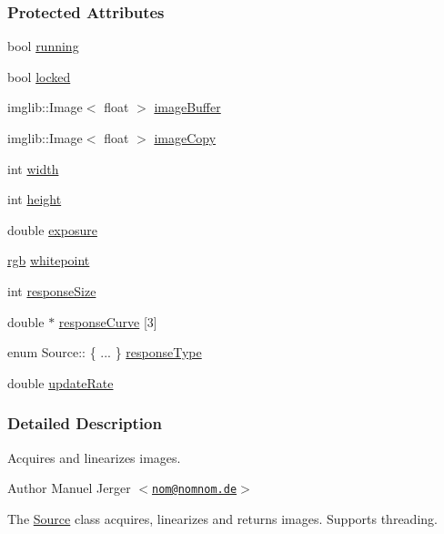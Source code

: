 \subsubsection*{\-Protected \-Attributes}
\begin{DoxyCompactItemize}
\item 
bool \hyperlink{classSource_a83d6fedd341d8b250233c3488b8e231b}{running}
\item 
bool \hyperlink{classSource_a045913a06b522caf5e2766c7dd560b64}{locked}
\item 
imglib\-::\-Image$<$ float $>$ \hyperlink{classSource_a411290665ab67a6a1c7ad4f52d06e9de}{image\-Buffer}
\item 
imglib\-::\-Image$<$ float $>$ \hyperlink{classSource_ad9a7cd1515ec31d5d8cb68896b967816}{image\-Copy}
\item 
int \hyperlink{classSource_a4cead9f95c3faf3f77ea3854ab2a7f10}{width}
\item 
int \hyperlink{classSource_aecf9a912fc51ff3d6c80fcfd871a8484}{height}
\item 
double \hyperlink{classSource_aa35ec9b311cf81ed05fea0ecfe19f42c}{exposure}
\item 
\hyperlink{structrgb}{rgb} \hyperlink{classSource_a08ffcbc3671134eeac92c71de15c2e37}{whitepoint}
\item 
int \hyperlink{classSource_a4bd6ea1c9d9b406dcc5607296083a944}{response\-Size}
\item 
double $\ast$ \hyperlink{classSource_ad303f13ffdd7db993c78843c0c4042e9}{response\-Curve} \mbox{[}3\mbox{]}
\item 
enum \-Source\-:: \{ ... \}  \hyperlink{classSource_ae1511ec3482e54664e82697faab80885}{response\-Type}
\item 
double \hyperlink{classSource_a43f5162009aceeca7fbfddcee7c53eff}{update\-Rate}
\end{DoxyCompactItemize}


\subsubsection{\-Detailed \-Description}
\-Acquires and linearizes images. 

\begin{DoxyAuthor}{\-Author}
\-Manuel \-Jerger $<$\href{mailto:nom@nomnom.de}{\tt nom@nomnom.\-de}$>$
\end{DoxyAuthor}
\-The \hyperlink{classSource}{\-Source} class acquires, linearizes and returns images. \-Supports threading. 

